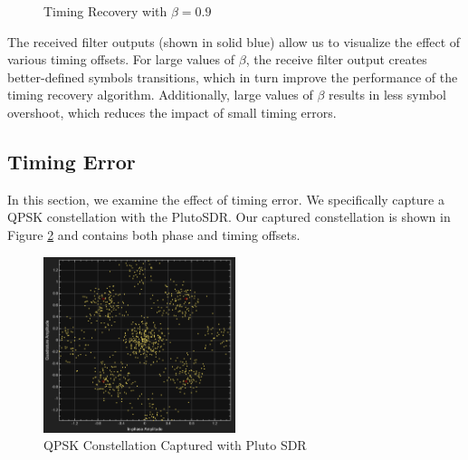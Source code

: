 \documentclass{article}
\begin{document}
\begin{figure}[H]
	\centerline{}
	\caption{Timing Recovery with $\beta=0.9$}
	\label{fig::timing_recovery_beta_0_9}
\end{figure}

\noindent The received filter outputs (shown in solid blue) allow us to visualize the effect of various timing offsets. For large values of $\beta$, the receive filter output creates better-defined symbols transitions, which in turn improve the performance of the timing recovery algorithm. Additionally, large values of $\beta$ results in less symbol overshoot, which reduces the impact of small timing errors.

\subsection{Timing Error}

In this section, we examine the effect of timing error. We specifically capture a QPSK constellation with the PlutoSDR. Our captured constellation is shown in Figure \ref{fig::pluto_constellation_raw} and contains both phase and timing offsets.

\begin{figure}[H]
	\centerline{\includegraphics[width=0.5\textwidth]{pluto_constellation_raw.png}}
	\caption{QPSK Constellation Captured with Pluto SDR}
	\label{fig::pluto_constellation_raw}
\end{figure}
\end{document}
